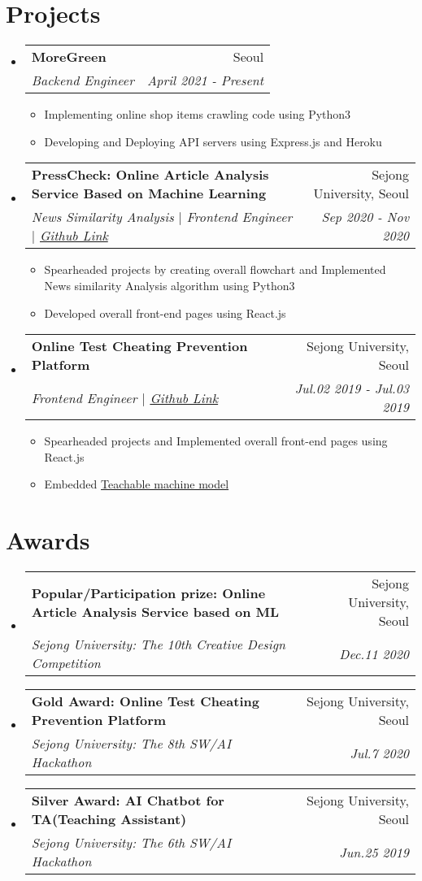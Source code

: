 \documentclass[letterpaper,11pt]{article}
\makeatletter
\newcommand{\resumeItem}[2]{
  \item\small{
    \textbf{#1}{ #2 \vspace{-2pt}}
  }
}
\newcommand{\resumeSubheading}[4]{
  \vspace{-1pt}\item
    \begin{tabular*}{0.97\textwidth}{l@{\extracolsep{\fill}}r}
      \textbf{#1} & #2 \\
      \textit{\small#3} & \textit{\small #4} \\
    \end{tabular*}\vspace{-10pt}
}
\newcommand{\resumeSubHeadingListStart}{\begin{itemize}[leftmargin=*]}
\newcommand{\resumeSubHeadingListEnd}{\end{itemize}}
\newcommand{\resumeItemListStart}{\begin{itemize}}
\newcommand{\resumeItemListEnd}{\end{itemize}\vspace{-5pt}}
\makeatother
\begin{document}
\section{Projects}
  \resumeSubHeadingListStart
    \resumeSubheading
      {MoreGreen}{Seoul}
      { Backend Engineer }{April 2021 - Present}
      \resumeItemListStart
        \resumeItem {}
          {Implementing online shop items crawling code using Python3}
        \resumeItem {}
          {Developing and Deploying API servers using Express.js and Heroku}
      \resumeItemListEnd
    \resumeSubheading
      {PressCheck: Online Article Analysis Service Based on Machine Learning}{Sejong University, Seoul}
      {News Similarity Analysis $\vert$ Frontend Engineer $\vert$ {\href{https://github.com/reyeon1209/PressCheck}{Github Link}}}{Sep 2020 - Nov 2020}
      \resumeItemListStart
        \resumeItem {}
          {Spearheaded projects by creating overall flowchart and Implemented News similarity Analysis algorithm using Python3}
        \resumeItem {}
          {Developed overall front-end pages using React.js}
      \resumeItemListEnd
    \resumeSubheading
      {Online Test Cheating Prevention Platform}{Sejong University, Seoul}
      {Frontend Engineer $\vert$ {\href{https://github.com/kimkyeongnam/8th-Sejong-University-Hackathon}{Github Link}}}{Jul.02 2019 - Jul.03 2019}
      \resumeItemListStart
        \resumeItem {}
          {Spearheaded projects and Implemented overall front-end pages using React.js}
        \resumeItem {}
          {Embedded {\href{https://teachablemachine.withgoogle.com/}{Teachable machine model}}}
      \resumeItemListEnd
  \resumeSubHeadingListEnd

\section{Awards}
  \resumeSubHeadingListStart
    \resumeSubheading
      {Popular/Participation prize: Online Article Analysis Service based on ML}{Sejong University, Seoul}
      {Sejong University: The 10th Creative Design Competition}{Dec.11 2020}
    \resumeSubheading
      {Gold Award: Online Test Cheating Prevention Platform}{Sejong University, Seoul}
      {Sejong University: The 8th SW/AI Hackathon}{Jul.7 2020}
    \resumeSubheading
      {Silver Award: AI Chatbot for TA(Teaching Assistant)}{Sejong University, Seoul}
      {Sejong University: The 6th SW/AI Hackathon}{Jun.25 2019}
    \resumeItemListStart
        \textbf{}
        {}
        {}
    \resumeItemListEnd
  \resumeSubHeadingListEnd
  
\end{document}
